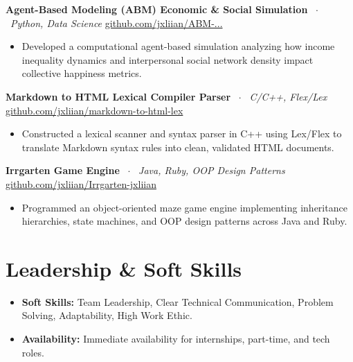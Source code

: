 \documentclass[10pt,a4paper]{article}
\begin{document}
\vspace{2pt}

\textbf{Agent-Based Modeling (ABM) Economic \& Social Simulation} \ $\cdot$ \ \textit{Python, Data Science} \hfill \href{https://github.com/jxliian/ABM-Income-Interpersonal-Relations-Impact-on-Happiness}{github.com/jxliian/ABM-...}
\begin{itemize}
    \item Developed a computational agent-based simulation analyzing how income inequality dynamics and interpersonal social network density impact collective happiness metrics.
\end{itemize}

\vspace{2pt}

\textbf{Markdown to HTML Lexical Compiler Parser} \ $\cdot$ \ \textit{C/C++, Flex/Lex} \hfill \href{https://github.com/jxliian/markdown-to-html-lex}{github.com/jxliian/markdown-to-html-lex}
\begin{itemize}
    \item Constructed a lexical scanner and syntax parser in C++ using Lex/Flex to translate Markdown syntax rules into clean, validated HTML documents.
\end{itemize}

\vspace{2pt}

\textbf{Irrgarten Game Engine} \ $\cdot$ \ \textit{Java, Ruby, OOP Design Patterns} \hfill \href{https://github.com/jxliian/Irrgarten-jxliian}{github.com/jxliian/Irrgarten-jxliian}
\begin{itemize}
    \item Programmed an object-oriented maze game engine implementing inheritance hierarchies, state machines, and OOP design patterns across Java and Ruby.
\end{itemize}

\section{Leadership \& Soft Skills}
\begin{itemize}
    \item \textbf{Soft Skills:} Team Leadership, Clear Technical Communication, Problem Solving, Adaptability, High Work Ethic.
    \item \textbf{Availability:} Immediate availability for internships, part-time, and tech roles.
\end{itemize}
\end{document}
